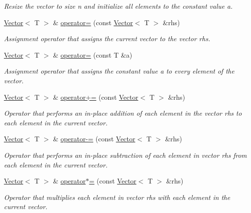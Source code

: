 \begin{DoxyCompactItemize}
\begin{DoxyCompactList}\small\item\em Resize the vector to size {\ttfamily n} and initialize all elements to the constant value {\ttfamily a}. \end{DoxyCompactList}\item 
\mbox{\hyperlink{classVector}{Vector}}$<$ T $>$ \& \mbox{\hyperlink{classVector_aa44e8e04a723f2c0bd9382a3bfa46e7c}{operator=}} (const \mbox{\hyperlink{classVector}{Vector}}$<$ T $>$ \&rhs)
\begin{DoxyCompactList}\small\item\em Assignment operator that assigns the current vector to the vector {\ttfamily rhs}. \end{DoxyCompactList}\item 
\mbox{\hyperlink{classVector}{Vector}}$<$ T $>$ \& \mbox{\hyperlink{classVector_a6bbf5f187006ef2567fdcebd37ebfa97}{operator=}} (const T \&a)
\begin{DoxyCompactList}\small\item\em Assignment operator that assigns the constant value {\ttfamily a} to every element of the vector. \end{DoxyCompactList}\item 
\mbox{\hyperlink{classVector}{Vector}}$<$ T $>$ \& \mbox{\hyperlink{classVector_a0cdad8a65e9dd1ef60afaf32aa547f9e}{operator+=}} (const \mbox{\hyperlink{classVector}{Vector}}$<$ T $>$ \&rhs)
\begin{DoxyCompactList}\small\item\em Operator that performs an in-\/place addition of each element in the vector {\ttfamily rhs} to each element in the current vector. \end{DoxyCompactList}\item 
\mbox{\hyperlink{classVector}{Vector}}$<$ T $>$ \& \mbox{\hyperlink{classVector_ab5ed11e19503bbc0ee10c7a8d1ee2978}{operator-\/=}} (const \mbox{\hyperlink{classVector}{Vector}}$<$ T $>$ \&rhs)
\begin{DoxyCompactList}\small\item\em Operator that performs an in-\/place subtraction of each element in vector {\ttfamily rhs} from each element in the current vector. \end{DoxyCompactList}\item 
\mbox{\hyperlink{classVector}{Vector}}$<$ T $>$ \& \mbox{\hyperlink{classVector_a3b3e94a4ee6601a8c3ceaed790c2d965}{operator$\ast$=}} (const \mbox{\hyperlink{classVector}{Vector}}$<$ T $>$ \&rhs)
\begin{DoxyCompactList}\small\item\em Operator that multiplies each element in vector {\ttfamily rhs} with each element in the current vector. \end{DoxyCompactList}\item 

\end{DoxyCompactItemize}
